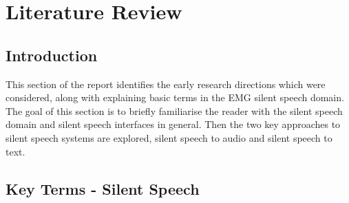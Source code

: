 \iffalse
Mark Scheme:
- Extensive Research
- Understanding of complex subject matter
- Identifies flaws, gaps or inconsistencies in extant knowledge
\fi

\iffalse

Mu-Law compression:
- compresses audio signal into discrete bins whilst preserving dynamic range

Current sEMG Silent Speech Text Classification Research:
- https://dspace.mit.edu/bitstream/handle/1721.1/123121/1128187233-MIT.pdf?sequence=1&isAllowed=y

\fi

\chapter{Literature Review} \label{chap:lit-review}

\section{Introduction}

This section of the report identifies the early research directions which were considered,
along with explaining basic terms in the EMG silent speech domain. The goal of this section
is to briefly familiarise the reader with the silent speech domain and silent speech
interfaces in general. Then the two key approaches to silent speech systems are explored,
silent speech to audio and silent speech to text.

\section{Key Terms - Silent Speech}


